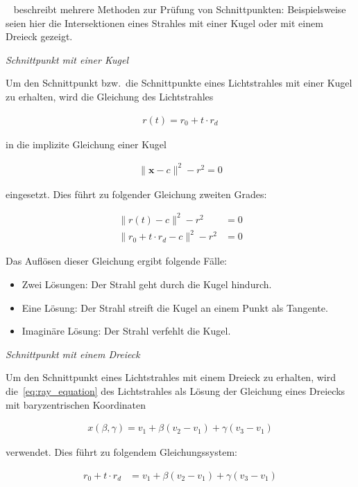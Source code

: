 ~\citeauthor{glassner_introduction_1989} beschreibt mehrere Methoden zur
Prüfung von Schnittpunkten: Beispielsweise seien hier die Intersektionen
eines Strahles mit einer Kugel oder mit einem Dreieck gezeigt.

\textit{Schnittpunkt mit einer Kugel}

Um den Schnittpunkt bzw.\ die Schnittpunkte eines Lichtstrahles mit
einer Kugel zu erhalten, wird die Gleichung des Lichtstrahles

\begin{gather}\label{eq:ray_equation}
    r(t) = r_{0} + t \cdot r_{d}
\end{gather}

in die implizite Gleichung einer Kugel

\begin{gather}
    \|\bm{x} - c\|^{2} - r^{2} = 0
\end{gather}

eingesetzt. Dies führt zu folgender Gleichung zweiten Grades:

\begin{align}
    \|r(t) - c\|^{2} - r^{2} &= 0 \\
    \|r_{0} + t \cdot r_{d} - c\|^{2} - r^{2} &= 0
\end{align}

Das Auflösen dieser Gleichung ergibt folgende Fälle:

\begin{itemize}
    \item{Zwei Lösungen}: Der Strahl geht durch die Kugel hindurch.
    \item{Eine Lösung}: Der Strahl streift die Kugel an einem Punkt als
        Tangente.
    \item{Imaginäre Lösung}: Der Strahl verfehlt die Kugel.
\end{itemize}


\textit{Schnittpunkt mit einem Dreieck}

Um den Schnittpunkt eines Lichtstrahles mit einem Dreieck zu erhalten,
wird die~\autoref{eq:ray_equation} des Lichtstrahles als Lösung
der Gleichung eines Dreiecks mit baryzentrischen Koordinaten

\begin{gather}
    x(\beta, \gamma) = v_{1} + \beta(v_{2} - v_{1}) + \gamma(v_{3} - v_{1})
\end{gather}

verwendet. Dies führt zu folgendem Gleichungssystem:

\begin{align}
    r_{0} + t \cdot r_{d} &= v_{1} + \beta(v_{2} - v_{1}) + \gamma(v_{3} - v_{1})
\end{align}

